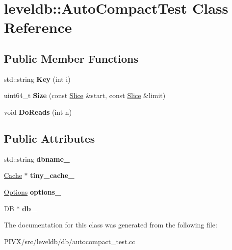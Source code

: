 \hypertarget{classleveldb_1_1_auto_compact_test}{}\section{leveldb\+:\+:Auto\+Compact\+Test Class Reference}
\label{classleveldb_1_1_auto_compact_test}
\subsection*{Public Member Functions}
\begin{DoxyCompactItemize}
\item 
\mbox{\label{classleveldb_1_1_auto_compact_test_a02993bed0b92d580bb0a51b92191eba9}} 
std\+::string {\bfseries Key} (int i)
\item 
\mbox{\label{classleveldb_1_1_auto_compact_test_a4be489ee1b3868f61d9976935e9b2bc4}} 
uint64\+\_\+t {\bfseries Size} (const \mbox{\hyperlink{classleveldb_1_1_slice}{Slice}} \&start, const \mbox{\hyperlink{classleveldb_1_1_slice}{Slice}} \&limit)
\item 
\mbox{\label{classleveldb_1_1_auto_compact_test_a1d1feea1aef1257e461c35eb5b51fa52}} 
void {\bfseries Do\+Reads} (int n)
\end{DoxyCompactItemize}
\subsection*{Public Attributes}
\begin{DoxyCompactItemize}
\item 
\mbox{\label{classleveldb_1_1_auto_compact_test_a9caaa257e508397f94fbe646893b7b3b}} 
std\+::string {\bfseries dbname\+\_\+}
\item 
\mbox{\label{classleveldb_1_1_auto_compact_test_a189cb5733d861b7df8c3bf945180afe5}} 
\mbox{\hyperlink{classleveldb_1_1_cache}{Cache}} $\ast$ {\bfseries tiny\+\_\+cache\+\_\+}
\item 
\mbox{\label{classleveldb_1_1_auto_compact_test_ad7f1f35214065627e4cadd0468d22c21}} 
\mbox{\hyperlink{structleveldb_1_1_options}{Options}} {\bfseries options\+\_\+}
\item 
\mbox{\label{classleveldb_1_1_auto_compact_test_a9e8d5f9bf0546b7d7fdf2128c66d8761}} 
\mbox{\hyperlink{classleveldb_1_1_d_b}{DB}} $\ast$ {\bfseries db\+\_\+}
\end{DoxyCompactItemize}


The documentation for this class was generated from the following file\+:\begin{DoxyCompactItemize}
\item 
P\+I\+V\+X/src/leveldb/db/autocompact\+\_\+test.\+cc\end{DoxyCompactItemize}
